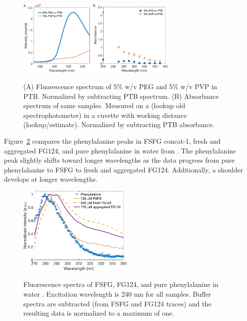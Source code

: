\begin{figure}
\caption[Fluorescence and absorbance of crowders.]{(A) Fluorescence spectrum of 5\% w/v PEG and 5\% w/v PVP in PTB.  Normalized by subtracting PTB spectrum.  (B) Absorbance spectrum of same samples.  Measured on a (lookup old spectrophotometer) in a cuvette with working distance (lookup/estimate).  Normalized by subtracting PTB absorbance.\\}
\centering
\includegraphics[width=0.7\textwidth]{figs/ch05/crowder-properties}
\label{fig:crowder-prop}
\end{figure}

Figure~\ref{fig:phe-comparison} compares the phenylalanine peaks in FSFG concat-1, fresh and aggregated FG124, and pure phenylalanine in water from \cite{prahl95}.  The phenylalanine peak slightly shifts toward longer wavelengths as the data progress from pure  phenylalanine to FSFG to fresh and aggregated FG124.  Additionally, a shoulder develops at longer wavelengths.

\begin{figure}
\caption[Fluorescence spectra of FSFG, FG124, and phenylalanine.]{Fluorescence spectra of FSFG, FG124, and pure phenylalanine in water \cite{prahl95}. Excitation wavelength is 240 nm for all samples. Buffer spectra are subtracted (from FSFG and FG124 traces) and the resulting data is normalized to a maximum of one. \\}
\centering
\includegraphics[width=0.5\textwidth]{figs/ch05/phe-comparison.pdf}
\label{fig:phe-comparison}
\end{figure}

